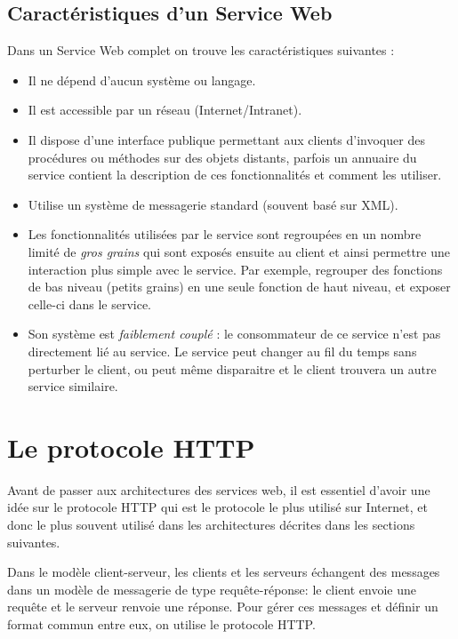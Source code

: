 \subsection{Caractéristiques d'un Service Web}
Dans un Service Web complet on trouve les caractéristiques suivantes \cite{refTutorialPointsWS} : 
\begin{itemize}
	\item Il ne dépend d'aucun système ou langage.
	\item Il est accessible par un réseau (Internet/Intranet).
	\item Il dispose d'une interface publique permettant aux clients d'invoquer des procédures ou méthodes sur des objets distants, parfois un annuaire du service contient la description de ces fonctionnalités et comment les utiliser.
	\item Utilise un système de messagerie standard (souvent basé sur XML).
	\item Les fonctionnalités utilisées par le service sont regroupées en un nombre limité de \emph{gros grains} qui sont exposés ensuite au client et ainsi permettre une interaction plus simple avec le service. Par exemple, regrouper des fonctions de bas niveau (petits grains) en une seule fonction de haut niveau, et exposer celle-ci dans le service.
	\item Son système est \emph{faiblement couplé} : le consommateur de ce service n'est pas directement lié au service. Le service peut changer au fil du temps sans perturber le client, ou peut même disparaitre et le client trouvera un autre service similaire.
\end{itemize}
		
\newpage
\section{Le protocole HTTP}
Avant de passer aux architectures des services web, il est essentiel d'avoir une idée sur le protocole HTTP qui est le protocole le plus utilisé sur Internet, et donc le plus souvent utilisé dans les architectures décrites dans les sections suivantes.

Dans le modèle client-serveur, les clients et les serveurs échangent des messages dans un modèle de messagerie de type requête-réponse: le client envoie une requête et le serveur renvoie une réponse.
Pour gérer ces messages et définir un format commun entre eux, on utilise le protocole HTTP\cite{HTTP}.

